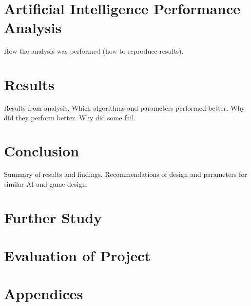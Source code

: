 \documentclass{bhamthesis}
\theoremstyle{definition}
\begin{document}
\chapter{Artificial Intelligence Performance Analysis}
How the analysis was performed (how to reproduce results).
\blindtext

\chapter{Results}
Results from analysis.
Which algorithms and parameters performed better.
Why did they perform better.
Why did some fail.

\chapter{Conclusion}
Summary of results and findings. Recommendations of design and parameters for similar AI and game design.

\chapter{Further Study}
\blindtext

\chapter{Evaluation of Project}
\blindtext





\backmatter



\chapter{Appendices}
\end{document}
